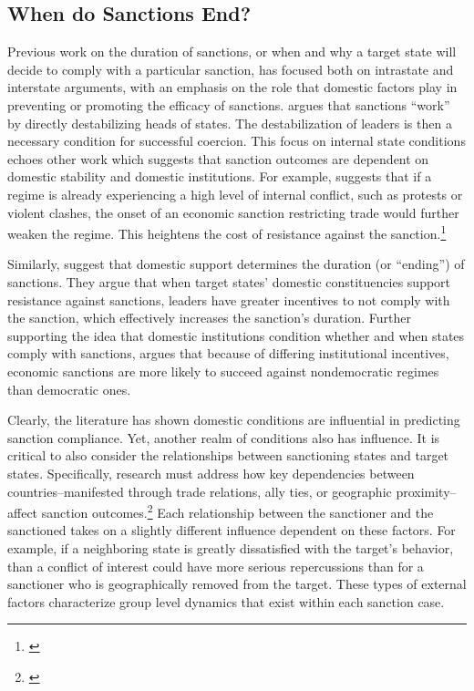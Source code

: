 \subsection*{When do Sanctions End?}
\label{lit}

Previous work on the duration of sanctions, or when and why a target state will decide to comply with a particular sanction, has focused both on intrastate and interstate arguments, with an emphasis on the role that domestic factors play in preventing or promoting the efficacy of sanctions. \cite{marinov2005} argues that sanctions ``work'' by directly destabilizing heads of states. The destabilization of leaders is then a necessary condition for successful coercion.  This focus on internal state conditions echoes other work which suggests that sanction outcomes are dependent on domestic stability and domestic institutions. For example, {\cite{dashti1997}} suggests that if a regime is already experiencing a high level of internal conflict, such as protests or violent clashes, the onset of an economic sanction restricting trade would further weaken the regime. This heightens the cost of resistance against the sanction.\footnote{\cite{dashti1997}} 

Similarly, \cite{dorussen2001} suggest that domestic support determines the duration (or ``ending'') of sanctions. They argue that when target states' domestic constituencies support resistance against sanctions, leaders have greater incentives to not comply with the sanction, which effectively increases the sanction's duration. Further supporting the idea that domestic institutions condition whether and when states comply with sanctions, \cite{lektzian2007} argues that because of differing institutional incentives, economic sanctions are more likely to succeed against nondemocratic regimes than democratic ones. 

Clearly, the literature has shown domestic conditions are influential in predicting sanction compliance. Yet, another realm of conditions also has influence. It is critical to also consider the relationships between sanctioning states and target states. Specifically, research must address how key dependencies between countries--manifested through trade relations, ally ties, or geographic proximity-- affect sanction outcomes.\footnote{\cite{mclean2010friends}} Each relationship between the sanctioner and the sanctioned takes on a slightly different influence dependent on these factors. For example, if a neighboring state is greatly dissatisfied with the target's behavior, than a conflict of interest could have more serious repercussions than for a sanctioner who is geographically removed from the target. These types of external factors characterize group level dynamics that exist within each sanction case. 

